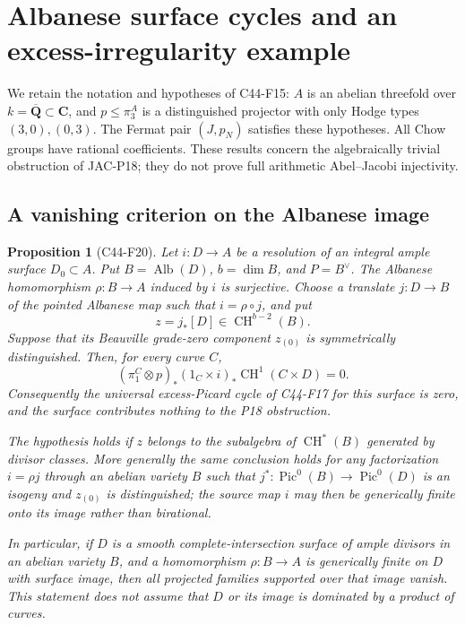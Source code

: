 \documentclass[11pt]{article}
\newtheorem{proposition}[theorem]{Proposition}
\theoremstyle{remark}\newtheorem{remark}[theorem]{Remark}
\begin{document}

\section{Albanese surface cycles and an excess-irregularity example}

We retain the notation and hypotheses of C44-F15: $A$ is
an abelian threefold over $k=\overline{\mathbf Q}\subset
\mathbf C$, and $p\le\pi_3^A$ is a distinguished projector
with only Hodge types $(3,0),(0,3)$.  The Fermat pair
$(J,p_N)$ satisfies these hypotheses.  All Chow groups
have rational coefficients.  These results concern the
algebraically trivial obstruction of JAC-P18; they do not
prove full arithmetic Abel--Jacobi injectivity.

\subsection{A vanishing criterion on the Albanese image}

\begin{proposition}[C44-F20]\label{C44-F20}
Let $i:D\to A$ be a resolution of an integral ample
surface $D_0\subset A$.  Put $B=\operatorname{Alb}(D)$,
$b=\dim B$, and $P=B^\vee$.  The Albanese homomorphism
$\rho:B\to A$ induced by $i$ is surjective.  Choose a
translate $j:D\to B$ of the pointed Albanese map such
that $i=\rho\circ j$, and put
\[
                        z=j_*[D]\in\operatorname{CH}^{b-2}(B).
 \tag{F20.1}
\]
Suppose that its Beauville grade-zero component $z_{(0)}$
is symmetrically distinguished.  Then, for every curve $C$,
\[
 (\pi_1^C\otimes p)_*(1_C\times i)_*
                    \operatorname{CH}^1(C\times D)=0.
 \tag{F20.2}
\]
Consequently the universal excess-Picard cycle of C44-F17
for this surface is zero, and the surface contributes
nothing to the P18 obstruction.

The hypothesis holds if $z$ belongs to the subalgebra
of $\operatorname{CH}^*(B)$ generated by divisor classes.
More generally the same conclusion holds for any
factorization $i=\rho j$ through an abelian variety $B$
such that $j^*:\operatorname{Pic}^0(B)\to
\operatorname{Pic}^0(D)$ is an isogeny and $z_{(0)}$ is
distinguished; the source map $i$ may then be generically
finite onto its image rather than birational.

In particular, if $D$ is a smooth complete-intersection
surface of ample divisors in an abelian variety $B$,
and a homomorphism $\rho:B\to A$ is generically finite
on $D$ with surface image, then all projected families
supported over that image vanish.  This statement does
not assume that $D$ or its image is dominated by a
product of curves.
\end{proposition}
\end{document}
